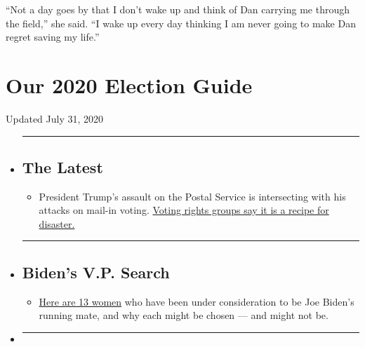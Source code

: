 ``Not a day goes by that I don't wake up and think of Dan carrying me
through the field,'' she said. ``I wake up every day thinking I am never
going to make Dan regret saving my life.''

\hypertarget{our-2020-election-guide}{%
\section{Our 2020 Election Guide}\label{our-2020-election-guide}}

Updated July 31, 2020

\begin{itemize}
\item
  \begin{center}\rule{0.5\linewidth}{\linethickness}\end{center}

  \hypertarget{the-latest}{%
  \subsection{The Latest}\label{the-latest}}

  \begin{itemize}
  \tightlist
  \item
    President Trump's assault on the Postal Service is intersecting with
    his attacks on mail-in voting.
    \href{https://www.nytimes.com/2020/07/31/us/politics/trump-usps-mail-delays.html?action=click\&pgtype=Article\&state=default\&region=BELOW_MAIN_CONTENT\&context=storylines_guide}{Voting
    rights groups say it is a recipe for disaster.}
  \end{itemize}
\item
  \begin{center}\rule{0.5\linewidth}{\linethickness}\end{center}

  \hypertarget{bidens-vp-search}{%
  \subsection{Biden's V.P. Search}\label{bidens-vp-search}}

  \begin{itemize}
  \tightlist
  \item
    \href{https://www.nytimes.com/article/biden-vice-president-2020.html?action=click\&pgtype=Article\&state=default\&region=BELOW_MAIN_CONTENT\&context=storylines_guide}{Here
    are 13 women} who have been under consideration to be Joe Biden's
    running mate, and why each might be chosen --- and might not be.
  \end{itemize}
\item
  \begin{center}\rule{0.5\linewidth}{\linethickness}\end{center}


\end{itemize}
